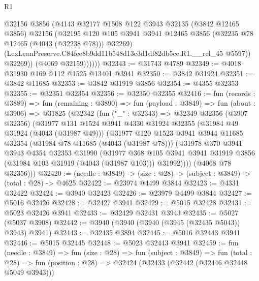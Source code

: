 \begin{lexlean}{R1}
\begin{coremodule}
                  @32156
                  @3856
                  (@4143
                    @32177
                    @1508
                    @122
                    @3943
                    @32135
                    (@3842 @12465 @3856)
                    @32156
                    (@32195
                      @120
                      @105
                      @3941
                      @3941
                      @12465
                      @3856
                      (@32235 @78 @12465 (@4043 (@32238 @78)))
                      @32269)
                    (LexLeanPreserve.C84fee8b9dd11b548d13c3d1df82db5ce.R1.__rel_45 @5597))
                  @32269))
              (@4069 @32159))))))
@32343 := @31743 @4789
@32349 := @4018 @31930 @169 @112 @1525 @13401 @3941
@32350 := @3842 @31924
@32351 := @3842 @11685
@32353 := @3842 @31919 @3856
@32354 := @4355 @32353
@32355 := @32351 @32354
@32356 := @32350 @32355
@32416 := fun (records : @3889) =>
  fun (remaining : @3890) =>
  fun (payload : @3849) =>
  fun (about : @3906) =>
  @31825
    (@32342
      (fun ("_" : @32343) =>
      @32349
        @32356
        (@3907 @32356)
        (@31977
          @131
          @1524
          @3941
          @4330
          @31924
          @32355
          (@31984 @49 @31924 (@4043 (@31987 @49)))
          (@31977
            @120
            @1523
            @3941
            @3944
            @11685
            @32354
            (@31984 @78 @11685 (@4043 (@31987 @78)))
            (@31978
              @370
              @3941
              @3943
              @4354
              @32353
              @31990
              (@31977
                @368
                @105
                @3941
                @3941
                @31919
                @3856
                (@31984 @103 @31919 (@4043 (@31987 @103)))
                @31992))))
        (@4068 @78 @32356)))
@32420 := (needle : @3849) -> (size : @28) -> (subject : @3849) -> (total : @28) -> @4625
@32422 := @23974 @4499 @3844
@32423 := @4331 @32422
@32424 := @3940 @32423
@32426 := @23979 @4499 @3844
@32427 := @5016 @32426
@32428 := @32427 @3941
@32429 := @5015 @32428
@32431 := @5023 @32426 @3941
@32433 := @32429 @32431 @3943
@32435 := @5027 (@5037 @3908)
@32442 := @3940 (@3940 (@3940 (@3945 (@32435 @5043)) @3943) @3941)
@32443 := @32435 @3894
@32445 := @5016 @32443 @3941
@32446 := @5015 @32445
@32448 := @5023 @32443 @3941
@32459 := fun (needle : @3849) =>
  fun (size : @28) =>
  fun (subject : @3849) =>
  fun (total : @28) => fun (position : @28) => @32424 (@32433 (@32442 (@32446 @32448 @5049 @3943)))

\end{coremodule}
\end{lexlean}
